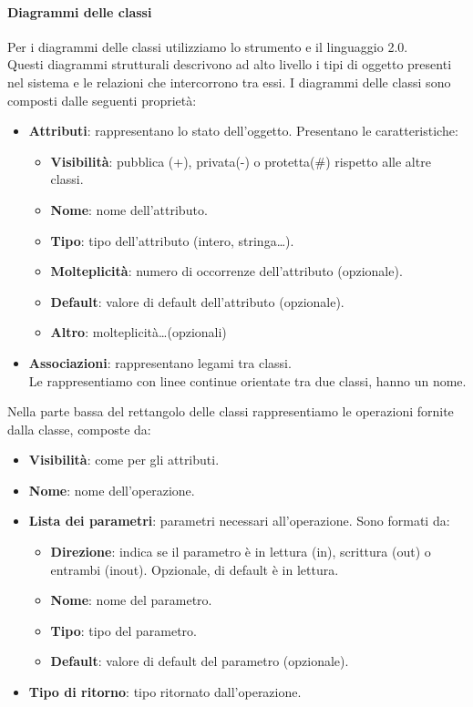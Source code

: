 		\paragraph{Diagrammi delle classi}\label{PP:Sviluppo:DiagrammiClassi}
		Per i diagrammi delle classi utilizziamo lo strumento  e il linguaggio  2.0.\\
        Questi diagrammi strutturali descrivono ad alto livello i tipi di oggetto presenti nel sistema e le relazioni che intercorrono tra essi.
		I diagrammi delle classi sono composti dalle seguenti proprietà:
		\begin{itemize}
			\item \textbf{Attributi}: rappresentano lo stato dell'oggetto. Presentano le caratteristiche:
			    \begin{itemize}
			        \item \textbf{Visibilità}: pubblica (+), privata(-) o protetta(\#) rispetto alle altre classi.
			        \item \textbf{Nome}: nome dell'attributo.
			        \item \textbf{Tipo}: tipo dell'attributo (intero, stringa\dots).
			        \item \textbf{Molteplicità}: numero di occorrenze dell'attributo (opzionale).
			        \item \textbf{Default}: valore di default dell'attributo (opzionale).
                    \item \textbf{Altro}: molteplicità\dots (opzionali)
			    \end{itemize}
			\item \textbf{Associazioni}: rappresentano legami tra classi.\\
                        Le rappresentiamo con linee continue orientate tra due classi, hanno un nome.
		\end{itemize}
        Nella parte bassa del rettangolo delle classi rappresentiamo le operazioni fornite dalla classe, composte da:
        \begin{itemize}
            \item \textbf{Visibilità}: come per gli attributi.
            \item \textbf{Nome}: nome dell'operazione.
            \item \textbf{Lista dei parametri}: parametri necessari all'operazione. Sono formati da:
            \begin{itemize}
                \item \textbf{Direzione}: indica se il parametro è in lettura (in), scrittura (out) o entrambi (inout). Opzionale, di default è in lettura.
                \item \textbf{Nome}: nome del parametro.
                \item \textbf{Tipo}: tipo del parametro.
                \item \textbf{Default}: valore di default del parametro (opzionale).
            \end{itemize}
            \item \textbf{Tipo di ritorno}: tipo ritornato dall'operazione.
        \end{itemize}
